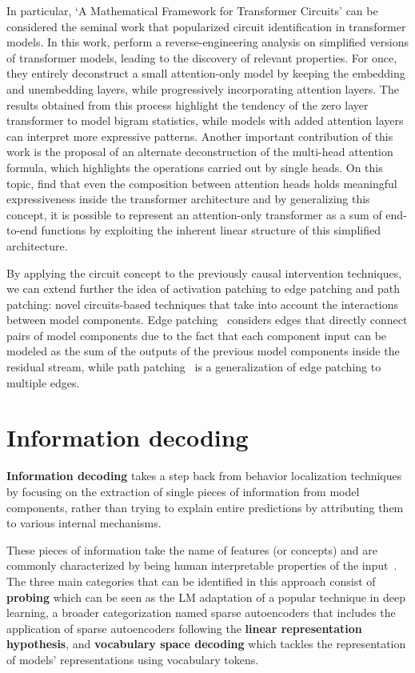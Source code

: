 In particular, `A Mathematical Framework for Transformer Circuits' \cite{elhage2021} can be considered the seminal work that popularized circuit identification in transformer models.
In this work, \citet{elhage2021} perform a reverse-engineering analysis on simplified versions of transformer models, leading to the discovery of relevant properties.
For once, they entirely deconstruct a small attention-only model by keeping the embedding and unembedding layers, while progressively incorporating attention layers.
The results obtained from this process highlight the tendency of the zero layer transformer to model bigram statistics, while models with added attention layers can interpret more expressive patterns.
Another important contribution of this work is the proposal of an alternate deconstruction of the multi-head attention formula, which highlights the operations carried out by single heads.
On this topic, \citet{elhage2021} find that even the composition between attention heads holds meaningful expressiveness inside the transformer architecture and by generalizing this concept, it is possible to represent an attention-only transformer as a sum of end-to-end functions by exploiting the inherent linear structure of this simplified architecture.

By applying the circuit concept to the previously causal intervention techniques, we can extend further the idea of activation patching to edge patching and path patching: novel circuits-based techniques that take into account the interactions between model components.
Edge patching~\cite{li2023} considers edges that directly connect pairs of model components due to the fact that each component input can be modeled as the sum of the outputs of the previous model components inside the residual stream, while path patching~\cite{wang2023} is a generalization of edge patching to multiple edges.

\section{Information decoding}

\textbf{Information decoding} takes a step back from behavior localization techniques by focusing on the extraction of single pieces of information from model components, rather than trying to explain entire predictions by attributing them to various internal mechanisms.

These pieces of information take the name of features (or concepts) and are commonly characterized by being human interpretable properties of the input~\cite{kim2018}.
The three main categories that can be identified in this approach consist of \textbf{probing} which can be seen as the LM adaptation of a popular technique in deep learning, a broader categorization named sparse autoencoders that includes the application of sparse autoencoders following the \textbf{linear representation hypothesis}, and \textbf{vocabulary space decoding} which tackles the representation of models' representations using vocabulary tokens.

